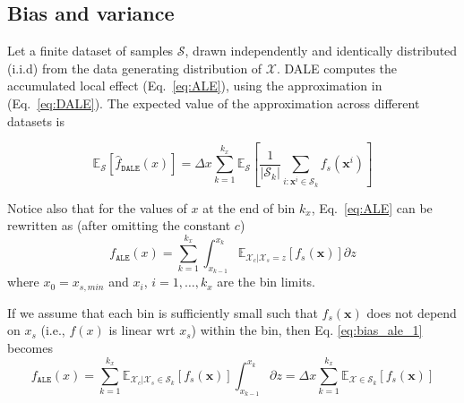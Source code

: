 \documentclass[wcp]{jmlr}
\newcommand{\dale}{\hat{f}_{\mathtt{DALE}}}
\newcommand{\Xcb}{\mathcal{X}_c}
\newcommand{\xb}{\mathbf{x}}
\begin{document}
\subsection{Bias and variance}
\label{sec:4-4-std}
Let a finite dataset of samples \(\mathcal{S}\), drawn independently
and identically distributed (i.i.d) from the data generating
distribution of \(\mathcal{X}\). DALE computes the accumulated local
effect (Eq.~\eqref{eq:ALE}), using the approximation in
(Eq.~\eqref{eq:DALE}). The expected value of the approximation across
different datasets is

\begin{equation}
  \mathbb{E}_{\mathcal{S}}[\dale(x)] =
  \Delta x\sum_{k=1}^{k_x}\mathbb{E}_{\mathcal{S}}[\frac{1}{|\mathcal{S}_k|}\sum_{i:\xb^i \in
      \mathcal{S}_k} f_s(\xb^i)]
  \label{eq:bias_dale}
\end{equation}

\noindent
Notice also that for the values of \(x\) at the end of bin \(k_x\),
Eq.~\eqref{eq:ALE} can be rewritten as (after omitting the constant
\(c\))
\begin{equation}
  f_{\mathtt{ALE}}(x) = \sum_{k = 1}^{k_x}\int_{x_{k-1}}^{x_k}
    \mathbb{E}_{\Xcb|\mathcal{X}_s=z}[f_s(\xb)] \partial z
    \label{eq:bias_ale_1}
\end{equation}
where \(x_0=x_{s, min}\) and \(x_i\), \(i=1, \dotsc, k_x\) are the bin limits.

\noindent
If we assume that each bin is sufficiently small such that \(f_s(\xb)\) does
not depend on \(x_s\) (i.e., \(f(x)\) is linear wrt \(x_s\)) within the bin, then
Eq. \eqref{eq:bias_ale_1} becomes
\begin{equation}
  f_{\mathtt{ALE}}(x) = \sum_{k = 1}^{k_x}\mathbb{E}_{\Xcb|\mathcal{X}_s \in
    \mathcal{S}_k}[f_s(\xb)]\int_{x_{k-1}}^{x_k} \partial z
  = \Delta x\sum_{k=1}^{k_x}\mathbb{E}_{\mathcal{X} \in \mathcal{S}_k}[f_s(\xb)]
    \label{eq:bias_ale_2}
\end{equation}
\end{document}
